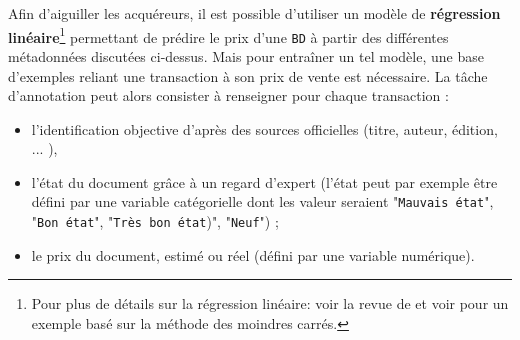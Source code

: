 				Afin d'aiguiller les acquéreurs, il est possible d’utiliser un modèle de \textbf{régression linéaire}\footnote{Pour plus de détails sur la régression linéaire: voir la revue de \cite{maalouf:2011:logistic-regression-data} et voir \cite{zdaniuk:2014:ordinary-leastsquares-ols} pour un exemple basé sur la méthode des moindres carrés.} permettant de prédire le prix d'une \texttt{BD} à partir des différentes métadonnées discutées ci-dessus.
				Mais pour entraîner un tel modèle, une base d'exemples reliant une transaction à son prix de vente est nécessaire.
				La tâche d'annotation peut alors consister à renseigner pour chaque transaction :
				\begin{itemize}
					\item l'identification objective d'après des sources officielles (titre, auteur, édition, ... ),
					\item l'état du document grâce à un regard d'expert (l'état peut par exemple être défini par une variable catégorielle dont les valeur seraient "\texttt{Mauvais état}", "\texttt{Bon état}", "\texttt{Très bon état})", "\texttt{Neuf}") ;
					\item le prix du document, estimé ou réel (défini par une variable numérique).
				\end{itemize}
				
